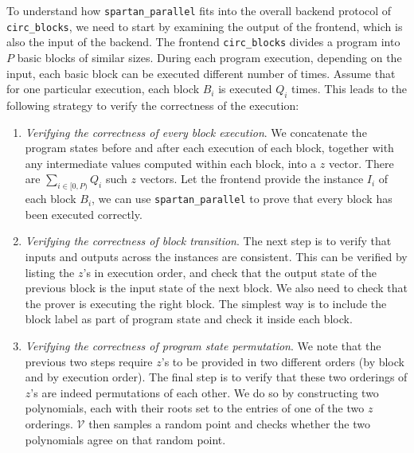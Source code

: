 \documentclass{article}
\newcommand{\code}{\texttt}
\newcommand{\V}{\mathcal{V}}
\begin{document}
To understand how \code{spartan\_parallel} fits into the overall backend protocol of \code{circ\_blocks}, we need to start by examining the output of the frontend, which is also the input of the backend. The frontend \code{circ\_blocks} divides a program into $P$ basic blocks of similar sizes. During each program execution, depending on the input, each basic block can be executed different number of times. Assume that for one particular execution, each block $B_i$ is executed $Q_i$ times. This leads to the following strategy to verify the correctness of the execution:
\begin{enumerate}
    \item \emph{Verifying the correctness of every block execution}. We concatenate the program states before and after each execution of each block, together with any intermediate values computed within each block, into a $z$ vector. There are $\sum_{i\in [0, P)} Q_i$ such $z$ vectors. Let the frontend provide the instance $I_i$ of each block $B_i$, we can use \code{spartan\_parallel} to prove that every block has been executed correctly.
    \item \emph{Verifying the correctness of block transition}. The next step is to verify that inputs and outputs across the instances are consistent. This can be verified by listing the $z$'s in execution order, and check that the output state of the previous block is the input state of the next block. We also need to check that the prover is executing the right block. The simplest way is to include the block label as part of program state and check it inside each block.
    \item \emph{Verifying the correctness of program state permutation}. We note that the previous two steps require $z$'s to be provided in two different orders (by block and by execution order). The final step is to verify that these two orderings of $z$'s are indeed permutations of each other. We do so by constructing two polynomials, each with their roots set to the entries of one of the two $z$ orderings. $\V$ then samples a random point and checks whether the two polynomials agree on that random point.
\end{enumerate}
\end{document}
